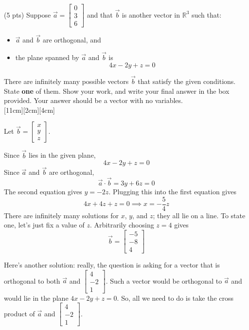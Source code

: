 \documentclass[11pt]{article}
\begin{document}
\begin{prob}

\begin{subprob}(5 pts) Suppose $\vec a = \begin{bmatrix} 0 \\ 3 \\ 6 \end{bmatrix}$ and that $\vec b$ is another vector in $\mathbb{R}^3$ such that: \\
\begin{itemize}
    \item $\vec a$ and $\vec b$ are orthogonal, and
    \item the plane spanned by $\vec a$ and $\vec b$ is $$4x - 2y + z = 0$$
\end{itemize} 

There are infinitely many possible vectors $\vec b$ that satisfy the given conditions. State \textbf{one} of them. Show your work, and write your final answer in the box provided. Your answer should be a vector with no variables. \\

[11cm][2cm][4cm]

\begin{solution}
Let $\vec b = \begin{bmatrix} x \\ y \\ z \end{bmatrix}$.

Since $\vec b$ lies in the given plane,
\[
4x-2y+z=0
\]
Since $\vec a$ and $\vec b$ are orthogonal,
\[
\vec a \cdot \vec b = 3y+6z=0
\]
The second equation gives $y=-2z$. Plugging this into the first equation gives
\[
4x+4z+z=0
\implies
x=-\frac{5}{4}z
\]
There are infinitely many solutions for $x$, $y$, and $z$; they all lie on a line. To state one, let's just fix a value of $z$. Arbitrarily choosing $z = 4$ gives
\[
\vec b = \boxed{\begin{bmatrix}-5\\-8\\4\end{bmatrix}}
\]

Here's another solution: really, the question is asking for a vector that is orthogonal to both $\vec a$ and $\begin{bmatrix} 4 \\ -2 \\ 1 \end{bmatrix}$. Such a vector would be orthogonal to $\vec a$ and would lie in the plane $4x-2y+z=0$. So, all we need to do is take the cross product of $\vec a$ and $\begin{bmatrix} 4 \\ -2 \\ 1 \end{bmatrix}$.


\end{solution}
\end{subprob}
\end{prob}
\end{document}
